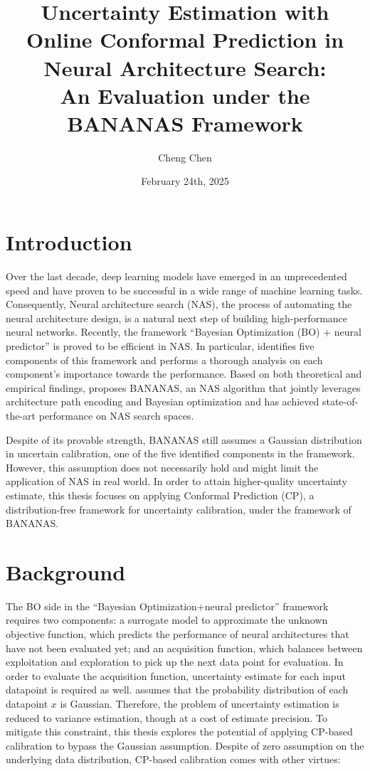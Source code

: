 \documentclass[a4paper]{scrartcl}
\title{
Uncertainty Estimation with Online Conformal Prediction in Neural Architecture Search: 
	\\ An Evaluation under the BANANAS Framework 
}
\author{Cheng Chen}
\date{February 24th, 2025}
\begin{document}
\maketitle

\section{Introduction}
Over the last decade, deep learning models have emerged in an unprecedented speed and have proven to be successful in a wide range of machine learning tasks. Consequently, Neural architecture search (NAS), the process of automating the neural architecture design, is a natural next step of building high-performance neural networks. 
Recently, the framework ``Bayesian Optimization (BO) + neural predictor'' is proved to be efficient in NAS. In particular, \cite{white2019bananas} identifies five components of this framework and performs a thorough analysis on each component’s importance towards the performance. Based on both theoretical and empirical findings, \cite{white2019bananas} proposes BANANAS, an NAS algorithm that jointly leverages architecture path encoding and Bayesian optimization and has achieved state-of-the-art performance on NAS search spaces. 

Despite of its provable strength, BANANAS still assumes a Gaussian distribution in uncertain calibration, one of the five identified components in the framework. However, this assumption does not necessarily hold and might limit the application of NAS in real world. In order to attain higher-quality uncertainty estimate, this thesis focuses on applying Conformal Prediction (CP), a distribution-free framework for uncertainty calibration, under the framework of BANANAS.


\section{Background}
The BO side in the ``Bayesian Optimization+neural predictor'' framework requires two components: a surrogate model to approximate the unknown objective function, which predicts the performance of neural architectures that have not been evaluated yet; and an acquisition function, which balances between exploitation and exploration to pick up the next data point for evaluation.  
In order to evaluate the acquisition function, uncertainty estimate for each input datapoint is required as well. \cite{white2019bananas} assumes that the probability distribution of each datapoint $x$ is Gaussian. Therefore, the problem of uncertainty estimation is reduced to variance estimation, though at a cost of estimate precision. To mitigate this constraint, this thesis explores the potential of applying CP-based calibration to bypass the Gaussian assumption. Despite of zero assumption on the underlying data distribution, CP-based calibration comes with other virtues:
\end{document}
